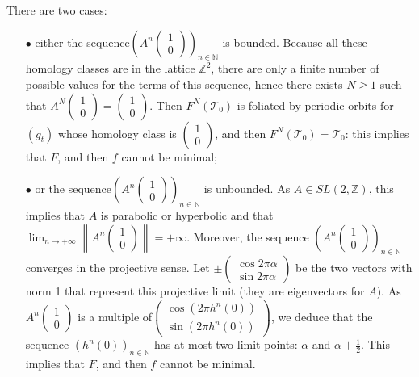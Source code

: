 \documentclass{dcds}
\theoremstyle{definition}
\begin{document}
There are two cases:
\begin{enumerate}
\item[$\bullet$]  either the sequence$\left( A^n\begin{pmatrix} 1\\0\end{pmatrix}\right)_{n\in{\mathbb {N}}} $ is bounded. Because all these homology classes are in the lattice ${\mathbb {Z}}^2$, there are  only a  finite number of possible values for the terms of this sequence, hence  there exists $N\geq 1$ such that $A^N \begin{pmatrix}1\\ 0\end{pmatrix}= \begin{pmatrix}1\\ 0\end{pmatrix}$. Then $F^N({\mathcal {T}}_0)$ is foliated by periodic orbits for $(g_t)$ whose homology class is $\begin{pmatrix} 1\\0\end{pmatrix}$, and then   $F^N({\mathcal {T}}_0)={\mathcal {T}}_0$: this implies that $F$, and then $f$ cannot be minimal;
\item[$\bullet$] or the sequence$\left( A^n\begin{pmatrix} 1\\0\end{pmatrix}\right)_{n\in{\mathbb {N}}}$ is unbounded. As $A\in SL(2, {\mathbb {Z}})$, this implies that $A$ is parabolic or hyperbolic and that $\displaystyle{\lim_{n\rightarrow +\infty} \left\|  A^n\begin{pmatrix} 1\\0\end{pmatrix}\right\| =+\infty}$. Moreover, the sequence  $\left( A^n\begin{pmatrix} 1\\0\end{pmatrix}\right)_{n\in{\mathbb {N}}}$ converges in the projective sense. Let $\pm\begin{pmatrix} \cos2\pi \alpha\\ \sin 2\pi\alpha \end{pmatrix}$ be the two vectors with norm 1 that represent this  projective limit (they are eigenvectors for $A$). As  $  A^n\begin{pmatrix} 1\\0\end{pmatrix} $ is a multiple of\break $\begin{pmatrix}\cos(2\pi h^n(0))\\ \sin(2\pi h^n(0))\end{pmatrix}$, we deduce that the sequence $(h^n(0))_{n\in{\mathbb {N}}}$ has at most two limit points: $\alpha$ and $\alpha+\frac{1}{2}$. This implies that $F$, and then $f$ cannot be minimal.
 \end{enumerate}
\end{document}
